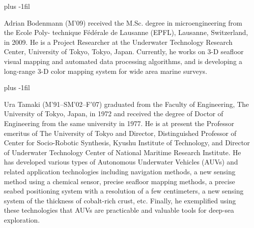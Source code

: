 \vskip 0pt plus -1fil

\begin{IEEEbiography}{Adrian Bodenmann}
(M’09) received the M.Sc. degree in microengineering from the Ecole Poly- technique Fédérale de Lausanne (EPFL), Lausanne, Switzerland, in 2009. He is a Project Researcher at the Underwater Technology Research Center, University of Tokyo, Tokyo, Japan. Currently, he works on 3-D seafloor visual mapping and automated data processing algorithms, and is developing a long-range 3-D color mapping system for wide area marine surveys.
\end{IEEEbiography}

\vskip 0pt plus -1fil

\begin{IEEEbiography}{Ura Tamaki}
(M’91–SM’02–F’07) graduated from the Faculty of Engineering, The University of Tokyo, Japan, in 1972 and received the degree of Doctor of Engineering from the same university in 1977. He is at present the Professor emeritus of The University of Tokyo and  Director, Distinguished Professor of Center for Socio-Robotic Synthesis, Kyushu Institute of Technology, and Director of Underwater Technology Center of National Maritime Research Institute. He has developed various types of Autonomous Underwater Vehicles (AUVs) and related application technologies including navigation methods, a new sensing method using a chemical sensor, precise seafloor mapping methods, a precise seabed positioning system with a resolution of a few centimeters, a new sensing system of the thickness of cobalt-rich crust, etc. Finally, he exemplified using these technologies that AUVs are practicable and valuable tools for deep-sea exploration.
\end{IEEEbiography}